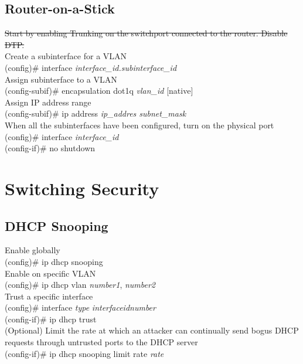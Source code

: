 \subsection{Router-on-a-Stick}
\doublespacing
\textrm{\sout{Start by enabling Trunking on the switchport connected to the router. Disable DTP.}\\Create a subinterface for a VLAN}\\
(config)\# interface \textit{interface\_id.subinterface\_id}\\
\textrm{Assign subinterface to a VLAN}\\
(config-subif)\# encapsulation dot1q \textit{vlan\_id} [native]\\
\textrm{Assign IP address range}\\
(config-subif)\# ip address \textit{ip\_addres subnet\_mask}\\
\textrm{When all the subinterfaces have been configured, turn on the physical port}\\
(config)\# interface \textit{interface\_id}\\
(config-if)\# no shutdown

\section{Switching Security}
\subsection{DHCP Snooping}
\textrm{Enable globally}\\
(config)\# ip dhcp snooping\\
\textrm{Enable on specific VLAN}\\
(config)\# ip dhcp vlan \textit{number1}, \textit{number2}\\
\textrm{Trust a specific interface}\\
(config)\# interface \textit{type} \textit{interfaceidnumber}\\
(config-if)\# ip dhcp trust\\
\textrm{(Optional) Limit the rate at which an attacker can continually send bogus DHCP requests through untrusted ports to the DHCP server}\\
(config-if)\# ip dhcp snooping limit rate \textit{rate}

